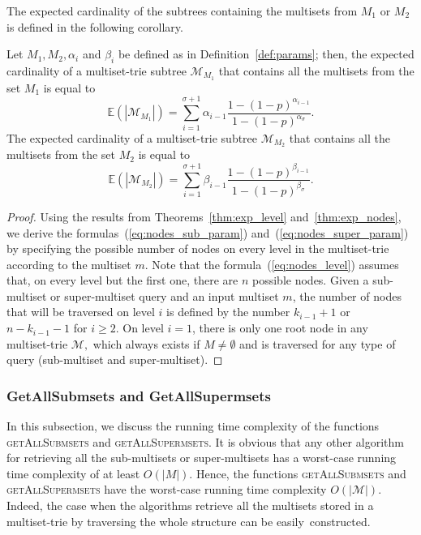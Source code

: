 \documentclass[algorithms,article,accept,pdftex,moreauthors]{Definitions/mdpi}
\begin{document}
The expected cardinality of the subtrees containing the multisets from $M_1$ or $M_2$ 
is defined in the following corollary.

\begin{Corollary}\label{cor:exp_nodes_param}
Let $M_1, M_2, \alpha_i$ and $\beta_i$ be defined as in  Definition~\ref{def:params}; 
then, the expected cardinality of a multiset-trie subtree $\mathcal{M}_{M_1}$ that contains all the multisets 
from the set $M_1$ is equal to 
\vspace{6pt} 
\begin{equation}\label{eq:nodes_sub_param}
\mathbb{E}( |\mathcal{M}_{M_1}| ) = \sum_{i=1}^{\sigma + 1} \alpha_{i-1} \frac{1-(1-p)^{\alpha_{i-1}}}{1-(1-p)^{\alpha_{\sigma}}}.
\end{equation}
The expected cardinality of a multiset-trie subtree $\mathcal{M}_{M_2}$ that contains all the multisets 
from the set $M_2$ is equal to 
\begin{equation}\label{eq:nodes_super_param}
\mathbb{E}( |\mathcal{M}_{M_2}| ) = \sum_{i=1}^{\sigma + 1} \beta_{i-1} \frac{1-(1-p)^{\beta_{i-1}}}{1-(1-p)^{\beta_{\sigma}}}.
\end{equation}
\end{Corollary}
%
\begin{proof}
Using the results from Theorems~\ref{thm:exp_level} and~\ref{thm:exp_nodes}, 
we derive the formulas~(\ref{eq:nodes_sub_param}) and~(\ref{eq:nodes_super_param}) 
by specifying the possible number of nodes on every level in the multiset-trie according 
to the multiset $m.$ Note that the formula~(\ref{eq:nodes_level}) assumes that, on every 
level but the first one, there are $n$ possible nodes. Given a sub-multiset or super-multiset 
query and an input multiset $m$, the number of nodes that will be traversed on level $i$ is 
defined by the number $k_{i-1}+1$ or $n-k_{i-1}-1$ for $i\geq 2.$ On level $i=1$, 
there is only one root node in any multiset-trie $\mathcal{M},$ which always exists 
if $M\neq\emptyset$ and is traversed for any type of query (sub-multiset and 
super-multiset).
\end{proof}

\subsubsection{GetAllSubmsets and GetAllSupermsets}\label{ss:getall}
In this subsection, we discuss the running time complexity of the functions 
\textsc{getAllSubmsets} and \textsc{getAllSupermsets}. It is obvious that any 
other algorithm for retrieving all the sub-multisets or super-multisets has a worst-case
running time complexity of at least $O(|M|).$ Hence, the functions 
\textsc{getAllSubmsets} and \textsc{getAllSupermsets} have the worst-case 
running time complexity $O(|\mathcal{M}|).$ Indeed, the case when the algorithms 
retrieve all the multisets stored in a multiset-trie by traversing the whole structure 
can be easily~constructed. 
\end{document}

